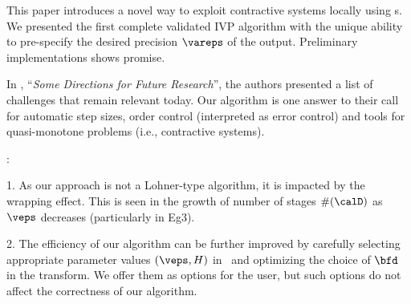 	This paper introduces a novel way to exploit
	contractive systems locally using \lognorm s.
	We presented the first complete validated IVP 
	algorithm with the unique ability to pre-specify the
	desired precision $\vareps$ of the output. 
	Preliminary implementations shows promise.

    
	In \cite[Section 10]{nedialkov+2:validated-ode:99}, 
	``{\em Some Directions for Future Research}'',
	the authors
	presented a list of challenges that remain relevant today.
	Our algorithm is one answer to their call for automatic
	step sizes, order control (interpreted as error control)
	and tools for quasi-monotone problems (i.e., contractive systems).

:
	1. As our approach is not a Lohner-type algorithm, it is 
	impacted by the wrapping effect.  This is seen in the growth of
	number of stages $\#(\calD)$ as $\veps$ decreases
	(particularly in Eg3).
	
	2. The efficiency of our algorithm can be further
	improved by carefully
	selecting appropriate parameter values $(\veps, H)$ in \stepA\ and
	optimizing the choice of $\bfd$ in the transform.
	We offer them as options for the user, but such options
	do not affect the correctness of our algorithm.
	



